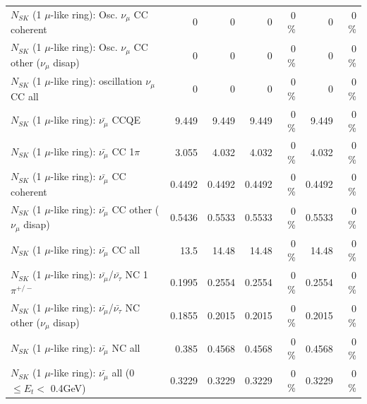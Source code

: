 \begin{table}
\begin{tabular}{| l | r | r | r  r | r  r |}
                        $N_{SK}$ (1 $\mu$-like ring): Osc. $\nu_\mu$ CC coherent &               0 &               0 &               0 &        0 \%  &               0 &        0 \%  \\ 
         $N_{SK}$ (1 $\mu$-like ring): Osc. $\nu_\mu$ CC other ($\nu_\mu$ disap) &               0 &               0 &               0 &        0 \%  &               0 &        0 \%  \\ 
                      $N_{SK}$ (1 $\mu$-like ring): oscillation $\nu_\mu$ CC all &               0 &               0 &               0 &        0 \%  &               0 &        0 \%  \\ 
\hline
\hline
                              $N_{SK}$ (1 $\mu$-like ring): $\bar{\nu_\mu}$ CCQE &           9.449 &           9.449 &           9.449 &        0 \%  &           9.449 &        0 \%  \\ 
                         $N_{SK}$ (1 $\mu$-like ring): $\bar{\nu_\mu}$ CC 1$\pi$ &           3.055 &           4.032 &           4.032 &        0 \%  &           4.032 &        0 \%  \\ 
                       $N_{SK}$ (1 $\mu$-like ring): $\bar{\nu_\mu}$ CC coherent &          0.4492 &          0.4492 &          0.4492 &        0 \%  &          0.4492 &        0 \%  \\ 
        $N_{SK}$ (1 $\mu$-like ring): $\bar{\nu_\mu}$ CC other ($\nu_\mu$ disap) &          0.5436 &          0.5533 &          0.5533 &        0 \%  &          0.5533 &        0 \%  \\ 
                          $N_{SK}$ (1 $\mu$-like ring): $\bar{\nu_{\mu}}$ CC all &            13.5 &           14.48 &           14.48 &        0 \%  &           14.48 &        0 \%  \\ 
\hline
  $N_{SK}$ (1 $\mu$-like ring): $\bar{\nu_\mu}$/$\bar{\nu_\tau}$ NC 1$\pi^{+/-}$ &          0.1995 &          0.2554 &          0.2554 &        0 \%  &          0.2554 &        0 \%  \\ 
$N_{SK}$ (1 $\mu$-like ring): $\bar{\nu_\mu}$/$\bar{\nu_\tau}$ NC other ($\nu_\mu$ disap) &          0.1855 &          0.2015 &          0.2015 &        0 \%  &          0.2015 &        0 \%  \\ 
                          $N_{SK}$ (1 $\mu$-like ring): $\bar{\nu_{\mu}}$ NC all &           0.385 &          0.4568 &          0.4568 &        0 \%  &          0.4568 &        0 \%  \\ 
\hline
   $N_{SK}$ (1 $\mu$-like ring): $\bar{\nu_{\mu}}$ all (0 $\leq E_{t} <$ 0.4GeV) &          0.3229 &          0.3229 &          0.3229 &        0 \%  &          0.3229 &        0 \%  \\ 

\end{tabular}
\end{table}
